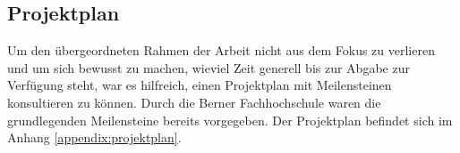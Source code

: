 \subsection{Projektplan}\label{chap:projektplan}
Um den übergeordneten Rahmen der Arbeit nicht aus dem Fokus zu verlieren und um sich bewusst zu machen, wieviel Zeit generell bis zur Abgabe zur Verfügung steht, war es hilfreich, einen Projektplan mit Meilensteinen konsultieren zu können. Durch die Berner Fachhochschule waren die grundlegenden Meilensteine bereits vorgegeben. Der Projektplan befindet sich im Anhang \ref{appendix:projektplan}.
